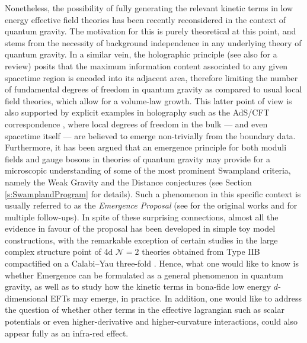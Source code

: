 Nonetheless, the possibility of fully generating the relevant kinetic terms in low energy effective field theories has been recently reconsidered in the context of quantum gravity. The motivation for this is purely theoretical at this point, and stems from the necessity of background independence in any underlying theory of quantum gravity. In a similar vein, the holographic principle \cite{tHooft:1993dmi,Susskind:1994vu,Bousso:1999xy, Bousso:1999cb} (see also \cite{Bousso:2002ju} for a review) posits that the maximum information content associated to any given spacetime region is encoded into its adjacent area, therefore limiting the number of fundamental degrees of freedom in quantum gravity as compared to usual local field theories, which allow for a volume-law growth. This latter point of view is also supported by explicit examples in holography such as the AdS/CFT correspondence \cite{Maldacena:1997re,Witten:1998qj}, where local degrees of freedom in the bulk --- and even spacetime itself --- are believed to emerge non-trivially from the boundary data. Furthermore, it has been argued that an emergence principle for both moduli fields and gauge bosons in theories of quantum gravity may provide for a microscopic understanding of some of the most prominent Swampland criteria, namely the Weak Gravity and the Distance conjectures (see Section \ref{s:SwamplandProgram} for details). Such a phenomenon in this specific context is usually referred to as the {\it Emergence Proposal} (see \cite{Harlow:2015lma, Grimm:2018ohb,Corvilain:2018lgw,Heidenreich:2017sim, Heidenreich:2018kpg,Palti:2019pca} for the original works and \cite{Castellano:2022bvr, Hamada:2021yxy,Marchesano:2022axe,Castellano:2023qhp,Blumenhagen:2023yws,Kawamura:2023cbd,Seo:2023xsb,Blumenhagen:2023tev,Blumenhagen:2023xmk,Calderon-Infante:2023uhz,Hattab:2023moj,Casas:2024ttx,Blumenhagen:2024ydy,Hattab:2024thi,Blumenhagen:2024lmo} for multiple follow-ups). In spite of these surprising connections, almost all the evidence in favour of the proposal has been developed in simple toy model constructions, with the remarkable exception of certain studies in the large complex structure point of 4d $\mathcal{N}=2$ theories obtained from Type IIB compactified on a Calabi--Yau three-fold \cite{Grimm:2018ohb}. Hence, what one would like to know is whether Emergence can be formulated as a general phenomenon in quantum gravity, as well as to study how the kinetic terms in bona-fide low energy $d$-dimensional EFTs may emerge, in practice. In addition, one would like to address the question of whether other terms in the effective lagrangian such as scalar potentials or even higher-derivative and higher-curvature interactions, could also appear fully as an infra-red effect.

